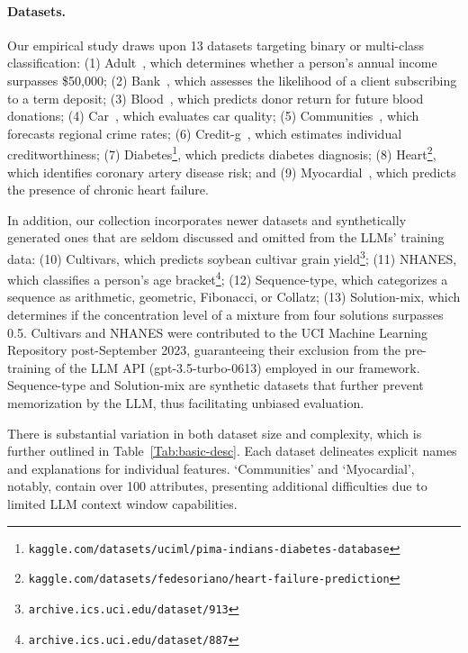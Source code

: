 \paragraph{Datasets.}
Our empirical study draws upon 13 datasets targeting binary or multi-class classification: (1) Adult~\cite{asuncion2007uci}, which determines whether a person’s annual income surpasses \$50,000; (2) Bank~\cite{moro2014data}, which assesses the likelihood of a client subscribing to a term deposit; (3) Blood~\cite{yeh2009knowledge}, which predicts donor return for future blood donations; (4) Car~\cite{kadra2021well}, which evaluates car quality; (5) Communities~\cite{misc_communities_and_crime_183}, which forecasts regional crime rates; (6) Credit-g~\cite{kadra2021well}, which estimates individual creditworthiness; (7) Diabetes\footnote{\texttt{kaggle.com/datasets/uciml/pima-indians-diabetes-database}}, which predicts diabetes diagnosis; (8) Heart\footnote{\texttt{kaggle.com/datasets/fedesoriano/heart-failure-prediction}}, which identifies coronary artery disease risk; and (9) Myocardial~\cite{misc_myocardial_infarction_complications_579}, which predicts the presence of chronic heart failure.

In addition, our collection incorporates newer datasets and synthetically generated ones that are seldom discussed and omitted from the LLMs' training data: (10) Cultivars, which predicts soybean cultivar grain yield\footnote{\texttt{archive.ics.uci.edu/dataset/913}}; (11) NHANES, which classifies a person’s age bracket\footnote{\texttt{archive.ics.uci.edu/dataset/887}}; (12) Sequence-type, which categorizes a sequence as arithmetic, geometric, Fibonacci, or Collatz; (13) Solution-mix, which determines if the concentration level of a mixture from four solutions surpasses 0.5. Cultivars and NHANES were contributed to the UCI Machine Learning Repository post-September 2023, guaranteeing their exclusion from the pre-training of the LLM API (gpt-3.5-turbo-0613) employed in our framework. Sequence-type and Solution-mix are synthetic datasets that further prevent memorization by the LLM, thus facilitating unbiased evaluation.

There is substantial variation in both dataset size and complexity, which is further outlined in Table~\ref{Tab:basic-desc}.
Each dataset delineates explicit names and explanations for individual features. ‘Communities’ and ‘Myocardial’, notably, contain over 100 attributes, presenting additional difficulties due to limited LLM context window capabilities.

